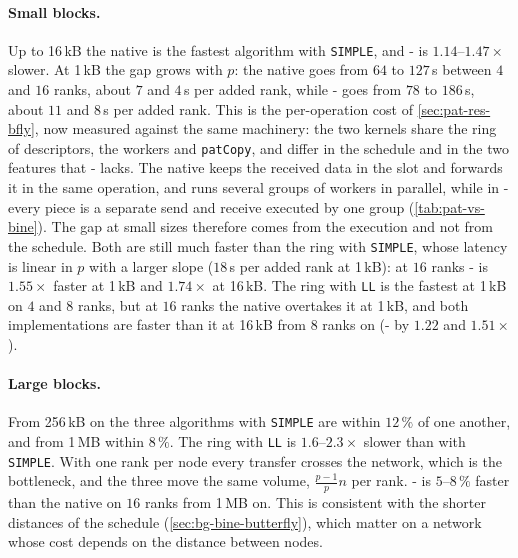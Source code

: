 \paragraph{Small blocks.}
Up to 16\,kB the native \pat{} is the fastest algorithm with \texttt{SIMPLE}, and \bine{}-\pat{} is $1.14$--$1.47\times$ slower.
At 1\,kB the gap grows with $p$: the native \pat{} goes from $64$ to $127$\,\textmu s between $4$ and $16$ ranks, about $7$ and $4$\,\textmu s per added rank, while \bine{}-\pat{} goes from $78$ to $186$\,\textmu s, about $11$ and $8$\,\textmu s per added rank.
This is the per-operation cost of \cref{sec:pat-res-bfly}, now measured against the same machinery: the two kernels share the ring of descriptors, the workers and \texttt{patCopy}, and differ in the schedule and in the two features that \bine{}-\pat{} lacks.
The native \pat{} keeps the received data in the slot and forwards it in the same operation, and runs several groups of workers in parallel, while in \bine{}-\pat{} every piece is a separate send and receive executed by one group (\cref{tab:pat-vs-bine}).
The gap at small sizes therefore comes from the execution and not from the schedule.
Both are still much faster than the ring with \texttt{SIMPLE}, whose latency is linear in $p$ with a larger slope ($18$\,\textmu s per added rank at 1\,kB): at $16$ ranks \bine{}-\pat{} is $1.55\times$ faster at 1\,kB and $1.74\times$ at 16\,kB.
The ring with \texttt{LL} is the fastest at 1\,kB on $4$ and $8$ ranks, but at $16$ ranks the native \pat{} overtakes it at 1\,kB, and both \pat{} implementations are faster than it at 16\,kB from $8$ ranks on (\bine{}-\pat{} by $1.22$ and $1.51\times$).

\paragraph{Large blocks.}
From 256\,kB on the three algorithms with \texttt{SIMPLE} are within $12\,\%$ of one another, and from 1\,MB within $8\,\%$. The ring with \texttt{LL} is $1.6$--$2.3\times$ slower than with \texttt{SIMPLE}.
With one rank per node every transfer crosses the network, which is the bottleneck, and the three move the same volume, $\tfrac{p-1}{p}n$ per rank.
\bine{}-\pat{} is $5$--$8\,\%$ faster than the native \pat{} on $16$ ranks from 1\,MB on.
This is consistent with the shorter distances of the \bine{} schedule (\cref{sec:bg-bine-butterfly}), which matter on a network whose cost depends on the distance between nodes.

